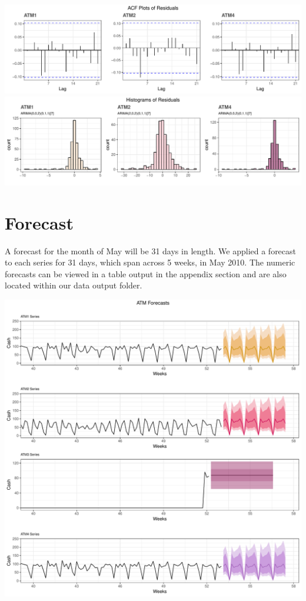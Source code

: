 \documentclass[openany]{book}
\begin{document}
\includegraphics{Part-A-JM_JO_files/figure-latex/unnamed-chunk-7-1.pdf}
\includegraphics{Part-A-JM_JO_files/figure-latex/unnamed-chunk-7-2.pdf}

\hypertarget{forecast}{%
\section{Forecast}\label{forecast}}

A forecast for the month of May will be 31 days in length. We applied a
forecast to each series for 31 days, which span across 5 weeks, in May
2010. The numeric forecasts can be viewed in a table output in the
appendix section and are also located within our data output folder.

\includegraphics{Part-A-JM_JO_files/figure-latex/unnamed-chunk-8-1.pdf}
\end{document}
